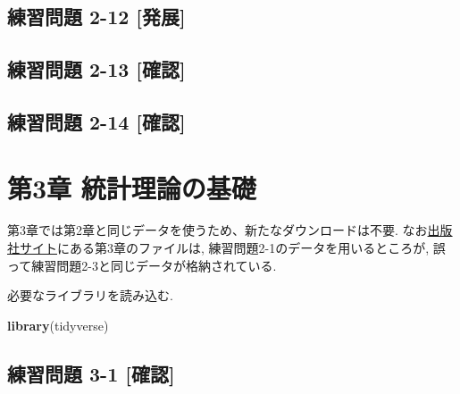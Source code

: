 \documentclass[
]{book}
\newenvironment{Shaded}{\begin{snugshade}}{\end{snugshade}}
\newcommand{\FunctionTok}[1]{\textcolor[rgb]{0.13,0.29,0.53}{\textbf{#1}}}
\newcommand{\NormalTok}[1]{#1}
\begin{document}
\hypertarget{ux7df4ux7fd2ux554fux984c-2-12-ux767aux5c55}{%
\section*{練習問題 2-12 {[}発展{]}}\label{ux7df4ux7fd2ux554fux984c-2-12-ux767aux5c55}}

\hypertarget{ux7df4ux7fd2ux554fux984c-2-13-ux78baux8a8d}{%
\section*{練習問題 2-13 {[}確認{]}}\label{ux7df4ux7fd2ux554fux984c-2-13-ux78baux8a8d}}

\hypertarget{ux7df4ux7fd2ux554fux984c-2-14-ux78baux8a8d}{%
\section*{練習問題 2-14 {[}確認{]}}\label{ux7df4ux7fd2ux554fux984c-2-14-ux78baux8a8d}}

\hypertarget{ch3}{%
\chapter*{第3章 統計理論の基礎}\label{ch3}}

第3章では第2章と同じデータを使うため、新たなダウンロードは不要.
なお\href{https://www.yuhikaku.co.jp/books/detail/9784641053854}{出版社サイト}にある第3章のファイルは, 練習問題2-1のデータを用いるところが, 誤って練習問題2-3と同じデータが格納されている.

必要なライブラリを読み込む.

\begin{Shaded}
\begin{Highlighting}[]
\FunctionTok{library}\NormalTok{(tidyverse)}
\end{Highlighting}
\end{Shaded}

\hypertarget{ux7df4ux7fd2ux554fux984c-3-1-ux78baux8a8d}{%
\section*{練習問題 3-1 {[}確認{]}}\label{ux7df4ux7fd2ux554fux984c-3-1-ux78baux8a8d}}
\end{document}
